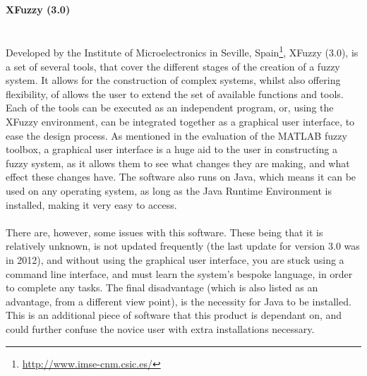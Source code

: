 \paragraph{XFuzzy (3.0)}\ \\
Developed by the Institute of Microelectronics in Seville, Spain\footnote{\url{http://www.imse-cnm.csic.es/}}, XFuzzy (3.0), is a set of several tools, that cover the different stages of the creation of a fuzzy system. It allows for the construction of complex systems, whilst also offering flexibility, of allows the user to extend the set of available functions and tools. Each of the tools can be executed as an independent program, or, using the XFuzzy environment, can be integrated together as a graphical user interface, to ease the design process. As mentioned in the evaluation of the MATLAB fuzzy toolbox, a graphical user interface is a huge aid to the user in constructing a fuzzy system, as it allows them to see what changes they are making, and what effect these changes have. The software also runs on Java, which means it can be used on any operating system, as long as the Java Runtime Environment is installed, making it very easy to access. \ \\
\ \\
There are, however, some issues with this software. These being that it is relatively unknown, is not updated frequently (the last update for version 3.0 was in 2012), and without using the graphical user interface, you are stuck using a command line interface, and must learn the system's bespoke language, in order to complete any tasks. The final disadvantage (which is also listed as an advantage, from a different view point), is the necessity for Java to be installed. This is an additional piece of software that this product is dependant on, and could further confuse the novice user with extra installations necessary. 


